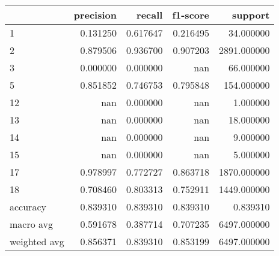 \begin{tabular}{lrrrr}
\toprule
 & precision & recall & f1-score & support \\
\midrule
1 & 0.131250 & 0.617647 & 0.216495 & 34.000000 \\
2 & 0.879506 & 0.936700 & 0.907203 & 2891.000000 \\
3 & 0.000000 & 0.000000 & nan & 66.000000 \\
5 & 0.851852 & 0.746753 & 0.795848 & 154.000000 \\
12 & nan & 0.000000 & nan & 1.000000 \\
13 & nan & 0.000000 & nan & 18.000000 \\
14 & nan & 0.000000 & nan & 9.000000 \\
15 & nan & 0.000000 & nan & 5.000000 \\
17 & 0.978997 & 0.772727 & 0.863718 & 1870.000000 \\
18 & 0.708460 & 0.803313 & 0.752911 & 1449.000000 \\
accuracy & 0.839310 & 0.839310 & 0.839310 & 0.839310 \\
macro avg & 0.591678 & 0.387714 & 0.707235 & 6497.000000 \\
weighted avg & 0.856371 & 0.839310 & 0.853199 & 6497.000000 \\
\bottomrule
\end{tabular}
